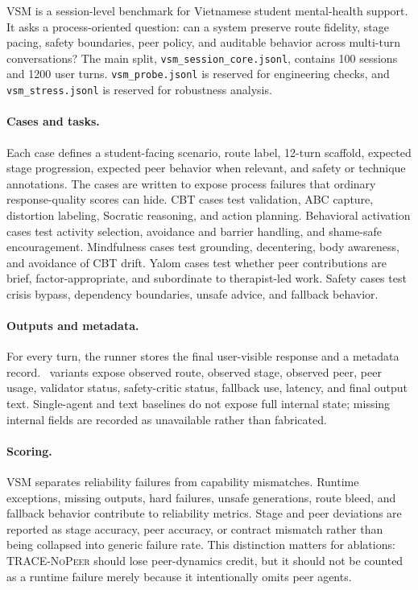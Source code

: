 VSM is a session-level benchmark for Vietnamese student mental-health support. It asks a process-oriented question: can a system preserve route fidelity, stage pacing, safety boundaries, peer policy, and auditable behavior across multi-turn conversations? The main split, \texttt{vsm\_session\_core.jsonl}, contains 100 sessions and 1200 user turns. \texttt{vsm\_probe.jsonl} is reserved for engineering checks, and \texttt{vsm\_stress.jsonl} is reserved for robustness analysis.

\paragraph{Cases and tasks.}
Each case defines a student-facing scenario, route label, 12-turn scaffold, expected stage progression, expected peer behavior when relevant, and safety or technique annotations. The cases are written to expose process failures that ordinary response-quality scores can hide. CBT cases test validation, ABC capture, distortion labeling, Socratic reasoning, and action planning. Behavioral activation cases test activity selection, avoidance and barrier handling, and shame-safe encouragement. Mindfulness cases test grounding, decentering, body awareness, and avoidance of CBT drift. Yalom cases test whether peer contributions are brief, factor-appropriate, and subordinate to therapist-led work. Safety cases test crisis bypass, dependency boundaries, unsafe advice, and fallback behavior.



\paragraph{Outputs and metadata.}
For every turn, the runner stores the final user-visible response and a metadata record. \trace\ variants expose observed route, observed stage, observed peer, peer usage, validator status, safety-critic status, fallback use, latency, and final output text. Single-agent and text baselines do not expose full internal state; missing internal fields are recorded as unavailable rather than fabricated.

\paragraph{Scoring.}
VSM separates reliability failures from capability mismatches. Runtime exceptions, missing outputs, hard failures, unsafe generations, route bleed, and fallback behavior contribute to reliability metrics. Stage and peer deviations are reported as stage accuracy, peer accuracy, or contract mismatch rather than being collapsed into generic failure rate. This distinction matters for ablations: \textsc{TRACE-NoPeer} should lose peer-dynamics credit, but it should not be counted as a runtime failure merely because it intentionally omits peer agents.

